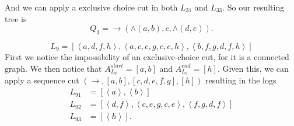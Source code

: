 \documentclass[a4paper]{report}
\begin{document}
And we can apply a exclusive choice cut in both $L_{31}$ and $L_{33}$. So our resulting
tree is \[
    Q_3=\to (\wedge(a,b),c,\wedge(d,e)).
\] 

\[
L_9=\left[ \left<a,d,f,h \right>,\left<a,c,e,g,c,e,h \right>,\left<b,f,g,d,f,h \right> \right] 
\]
First we notice the impossibility of an exclusive-choice cut, for it is a connected graph. We
then notice that $A_{L_9}^{start}=[a,b]$ and $A_{L_9}^{end}=[h]$. Given this, we can apply a
sequence cut $(\to ,[a,b], [c,d,e,f,g],[h])$ resulting in the logs
\begin{equation}
    \begin{split}
	L_{91}&=\left[ \left<a \right>, \left<b \right> \right] \\
	L_{92}&=\left[ \left<d,f \right>, \left<c,e,g,c,e \right>,\left<f,g,d,f \right> \right]
	\\
	L_{93}&=\left[ \left<h \right> \right] .
    \end{split}
\end{equation}
\end{document}
